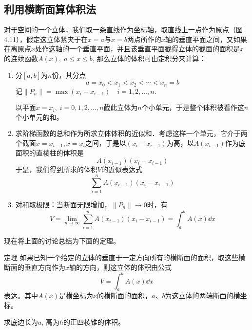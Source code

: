 \subsection{利用横断面算体积法}
对于空间的一个立体，我们取一条直线作为坐标轴，取直线上一点作为原点（图4.11），假定这立体紧夹于在$x=a$与$x=b$两点所作的$x$轴的垂直平面之间，又如果在离原点$x$处作这轴的一个垂直平面，并且该垂直平面截得立体的截面的面积是$x$的连续函数$A(x),\; a\le x\le b$, 那么立体的体积可由定积分来计算：
\begin{figure}[htp]
    \centering
    
    \caption{}
\end{figure}

\begin{enumerate}
    \item 分$[a,b]$为$n$份，其分点
\[a=x_0<x_1<x_2<\cdots<x_n=b\]
    记$\|P_n\|=\max(x_i-x_{i-1})\quad i=1, 2,\ldots,n$.

    以平面$x=x_i,\; i=0, 1, 2,\ldots,n$截此立体为$n$个小单元，于是整个体积被看作这$n$个小单元的和。
\item  求阶梯函数的总和作为所求立体体积的近似和．考虑这样一个单元，它介于两个截面$x=x_{i-1},x=x_i$之间，于是以$(x_i-x_{i-1})$为高，以$A(x_{i-1})$作为底面积的直棱柱的体积是
  \[  A (x_{i-1}) (x_i-x_{i-1})\]
    于是，我们得到所求的体积$V$的近似表达式
    \[\sum^n_{i=1}A (x_{i-1}) (x_i-x_{i-1})\] 
    \item 对和取极限：当断面无限增加，$\|P_n\|\to 0$时，有
\[V=\lim_{n\to\infty}\sum^n_{i=1}A (x_{i-1}) (x_i-x_{i-1})=\int^b_a A(x)\dd x\]
\end{enumerate}

现在将上面的讨论总结为下面的定理。

\begin{blk}
   {定理} 如果已知一个给定的立体的垂直于一定方向所有的横断面的面积，取这些横断面的垂直方向作为$x$轴的方向，则这立体的体积由公式
\[V=\int^b_a A (x) \dd x\]
表达。其中$A(x)$是横坐标为$x$的横断面的面积，$a$、$b$为这立体的两端断面的横坐标。 
\end{blk}

\begin{example}
    求底边长为$a$, 高为$h$的正四棱锥的体积。
\end{example}

